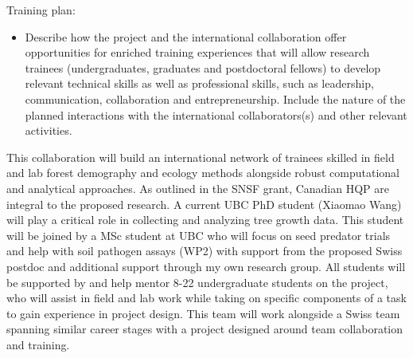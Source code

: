 \documentclass[12pt,oneside]{article}
\newenvironment{smitemize}{
\begin{itemize}
  \setlength{\itemsep}{1pt}
  \setlength{\parskip}{0pt}
  \setlength{\parsep}{0pt}}
{\end{itemize}
}
\begin{document}
{\sc Training plan:}  %
\vspace{-1ex}
\begin{smitemize}
\item  Describe how the project and the international collaboration offer opportunities for enriched training experiences that will allow research trainees (undergraduates, graduates and postdoctoral fellows) to develop relevant technical skills as well as professional skills, such as leadership, communication, collaboration and entrepreneurship. Include the nature of the planned interactions with the international collaborators(s) and other relevant activities.
\end{smitemize}
This collaboration will build an international network of trainees skilled in field and lab forest demography and ecology methods alongside robust computational and analytical approaches. As outlined in the SNSF grant, Canadian HQP are integral to the proposed research. A current UBC PhD student (Xiaomao Wang) will play a critical role in collecting and analyzing tree growth data. This student will be joined by a MSc student at UBC who will focus on seed predator trials and help with soil pathogen assays (WP2) with support from the proposed Swiss postdoc and additional support through my own research group. All students will be supported by and help mentor 8-22 undergraduate students on the project, who will assist in field and lab work while taking on specific components of a task to gain experience in project design. This team will work alongside a Swiss team spanning similar career stages with a project designed around team collaboration and training.
\end{document}
